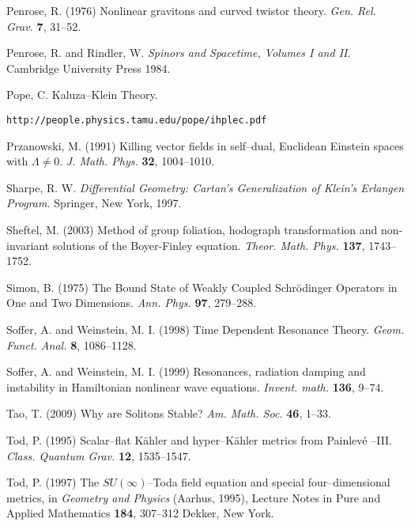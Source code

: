 \begin{thebibliography}{}
 Penrose, R. (1976) Nonlinear 
gravitons and curved twistor theory. \textit{Gen. Rel. Grav.}  {\bf 7},  31--52.

 Penrose, R. and Rindler, W.
\textit{Spinors and Spacetime, Volumes I and II.} Cambridge University Press 1984.

 Pope, C.
Kaluza--Klein Theory.

{\tt http://people.physics.tamu.edu/pope/ihplec.pdf}


 Przanowski, M. (1991)
Killing vector fields in self--dual, Euclidean Einstein spaces with $\Lambda\neq 0$.
\textit{J. Math. Phys.} {\bf 32}, 1004--1010.

 Sharpe, R. W.
\textit{Differential Geometry: Cartan's Generalization of Klein's Erlangen Program.} Springer, New York, 1997.

 Sheftel, M. (2003)
Method of group foliation, hodograph transformation and non-invariant solutions of the Boyer-Finley equation. \textit{Theor. Math. Phys.} {\bf 137}, 1743--1752.

 Simon, B. (1975)
The Bound State of Weakly Coupled Schr\"odinger Operators in One and Two Dimensions. \textit{Ann. Phys.} {\bf 97}, 279--288.


 Soffer, A. and Weinstein, M. I. (1998)
Time Dependent Resonance Theory. \textit{Geom. Funct. Anal.} {\bf 8}, 1086--1128.

 Soffer, A. and Weinstein, M. I. (1999)
Resonances, radiation damping and instability in Hamiltonian nonlinear wave equations. \textit{Invent. math.} {\bf 136}, 9--74.

 Tao, T. (2009)
Why are Solitons Stable? \textit{Am. Math. Soc.} {\bf 46}, 1--33.

 Tod, P. (1995)
Scalar--flat K\"ahler and hyper--K\"ahler metrics from Painlev\'e --III.
\textit{Class. Quantum Grav.} {\bf 12}, 1535--1547.

 Tod, P. (1997)
The $SU(\infty)$--Toda field equation and special four--dimensional metrics,
in {\em Geometry and Physics} (Aarhus, 1995), Lecture Notes in Pure and Applied Mathematics {\bf 184}, 307--312 Dekker, New York.


\end{thebibliography}
